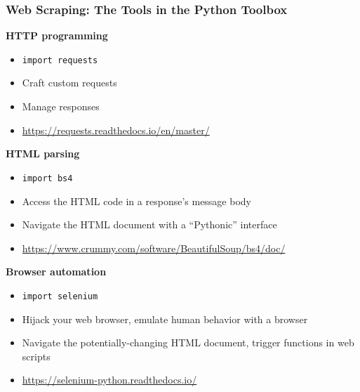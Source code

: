 \documentclass[10pt, aspectratio=1610, natbib, handout]{beamer}
\begin{document}
  \begin{frame}
    \frametitle{Web Scraping: The Tools in the Python Toolbox}

    \textbf{HTTP programming}
    \begin{itemize}
      \item \alert{\texttt{import requests}}
      \item Craft custom requests
      \item Manage responses
      \item \url{https://requests.readthedocs.io/en/master/}
    \end{itemize}

    \vfill\pause

    \textbf{HTML parsing}
    \begin{itemize}
      \item \alert{\texttt{import bs4}}
      \item Access the HTML code in a response's message body
      \item Navigate the HTML document with a ``Pythonic'' interface
      \item \url{https://www.crummy.com/software/BeautifulSoup/bs4/doc/}
    \end{itemize}

    \vfill\pause

    \textbf{Browser automation}
    \begin{itemize}
      \item \alert{\texttt{import selenium}}
      \item Hijack your web browser, emulate human behavior with a browser
      \item Navigate the potentially-changing HTML document, trigger functions in web scripts
      \item \url{https://selenium-python.readthedocs.io/}
    \end{itemize}

  \end{frame}
\end{document}
